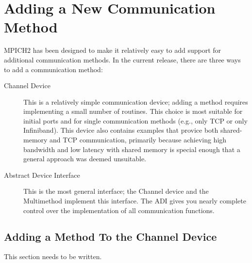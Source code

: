 \documentclass{article}
\begin{document}
%

\section{Adding a New Communication Method}
\label{sec:adding-methods}
MPICH2 has been designed to make it relatively easy to add support for
additional communication methods.  In the current release, there are three
ways to add a communication method:
\begin{description}
\item[Channel Device]This is a relatively simple communication device; adding
  a method requires implementing a small number of routines.  This choice is
  most suitable for initial ports and for single communication methods (e.g.,
  only TCP or only Infiniband).  This device also contains examples
  that provice both shared-memory and TCP communication, primarily
  because achieving high bandwidth and low latency with shared memory
  is special enough that a general approach was deemed unsuitable.


\item[Abstract Device Interface]This is the most general interface; the
  Channel device and the Multimethod implement this interface.  The ADI gives
  you nearly complete control over the implementation of all communication
  functions.
\end{description}

\subsection{Adding a Method To the Channel Device}
\label{sec:adding-channel}

This section needs to be written.
\end{document}

